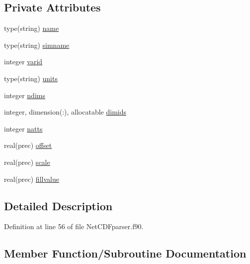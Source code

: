\subsection*{Private Attributes}
\begin{DoxyCompactItemize}
\item 
type(string) \mbox{\hyperlink{structnetcdfparser__mod_1_1var__t_a86d1bd82de1a8bcd684e0d75cc3d9cc3}{name}}
\item 
type(string) \mbox{\hyperlink{structnetcdfparser__mod_1_1var__t_af5ea209bf909357b775640ad4e9e43d3}{simname}}
\item 
integer \mbox{\hyperlink{structnetcdfparser__mod_1_1var__t_af3b333b148f6159bade3f9263c03892e}{varid}}
\item 
type(string) \mbox{\hyperlink{structnetcdfparser__mod_1_1var__t_ac7b0d52ef17496213c66b5a34dc8f8b6}{units}}
\item 
integer \mbox{\hyperlink{structnetcdfparser__mod_1_1var__t_a1aef5b6886c1e1cbb6714745dfd8d2aa}{ndims}}
\item 
integer, dimension(\+:), allocatable \mbox{\hyperlink{structnetcdfparser__mod_1_1var__t_a1bb991339dd3410a02d8e36a70672e61}{dimids}}
\item 
integer \mbox{\hyperlink{structnetcdfparser__mod_1_1var__t_aeae7353a3f58ee5efac21563a56b41ac}{natts}}
\item 
real(prec) \mbox{\hyperlink{structnetcdfparser__mod_1_1var__t_a04d38d90fee93b81da854bd218df23a1}{offset}}
\item 
real(prec) \mbox{\hyperlink{structnetcdfparser__mod_1_1var__t_a11a2f51aa328c9c0387b543f3a5c2485}{scale}}
\item 
real(prec) \mbox{\hyperlink{structnetcdfparser__mod_1_1var__t_a8e89e092236a61f096a44ad123d4d35e}{fillvalue}}
\end{DoxyCompactItemize}


\subsection{Detailed Description}


Definition at line 56 of file Net\+C\+D\+Fparser.\+f90.



\subsection{Member Function/\+Subroutine Documentation}
\mbox{\label{structnetcdfparser__mod_1_1var__t_a0cd9a195dc76bda0993ee246474e9b08}} 
